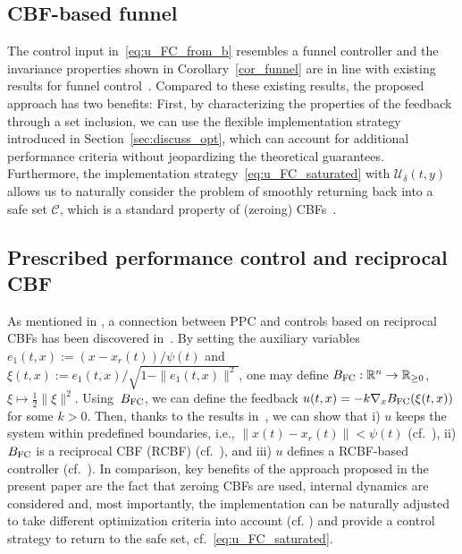 \documentclass[journal,twoside,web]{ieeeconf}
\newcommand{\R}{\mathbb{R}}
\begin{document}
\subsection{CBF-based funnel}
\label{sec:discuss_funnel}
The control input in~\eqref{eq:u_FC_from_b} resembles a funnel controller and the invariance properties shown in Corollary~\ref{cor_funnel} are in line with existing results for funnel control~\cite{BergIlch21}. Compared to these existing results, the proposed approach has two benefits:
First, by characterizing the properties of the feedback through a set inclusion, we can use the flexible implementation strategy introduced in Section~\ref{sec:discuss_opt}, which can account for additional performance criteria without jeopardizing the theoretical guarantees. 
Furthermore, the implementation strategy~\eqref{eq:u_FC_saturated} with $\mathcal{U}_\delta(t,y)$ allows us to naturally consider the problem of smoothly returning back into a safe set $\mathcal{C}$, which is a standard property of (zeroing) CBFs~\cite{ames2016control}. 

\subsection{Prescribed performance control and reciprocal CBF} \label{Sec:PPC_and_TVRCBF}
As mentioned in , a connection between PPC and controls based on reciprocal CBFs has been discovered in~\cite{namerikawa2024equivalence}.
By setting the auxiliary variables $e_1(t,x) := (x-x_r(t))/\psi(t)$ and $\xi(t,x) := e_1(t,x)/\sqrt{1-\|e_1(t,x)\|^2}$, one may
define ${ B_{\rm FC} :  \R^n  \to \R_{\ge 0}}$, $\xi  \mapsto \tfrac{1}{2} \|\xi\|^2$.
Using~$B_{\rm FC}$, we can define the feedback $u(t,x) = -k \nabla_x B_{\rm FC}(\xi(t,x)) $ for some $k > 0$.
Then, thanks to the results in~\cite{namerikawa2024equivalence}, we can show that 
i) $u$ keeps the system within predefined boundaries, i.e., $\|x(t)-x_r(t)\|<\psi(t)$ (cf.~\cite[Thm.~2]{namerikawa2024equivalence}), 
ii) $B_{\rm FC}$ is a reciprocal CBF (RCBF) (cf.~\cite[Thm.~2]{namerikawa2024equivalence}),
and iii) $u$ defines a RCBF-based controller (cf.~\cite[Thm.~4]{namerikawa2024equivalence}).
In comparison, key benefits of the approach proposed in the present paper are the fact that zeroing CBFs are used, internal dynamics are considered and, most importantly, the implementation can be naturally adjusted to take  different optimization criteria into account (cf. ) and provide a control strategy to return to the safe set, cf.~\eqref{eq:u_FC_saturated}.
\end{document}
